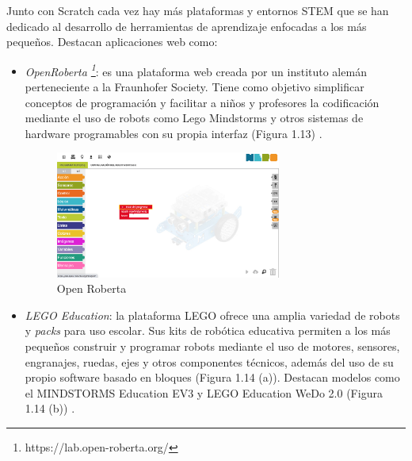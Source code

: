 Junto con Scratch cada vez hay más plataformas y entornos STEM que se han dedicado al desarrollo de herramientas de aprendizaje enfocadas a los más pequeños. Destacan aplicaciones web como: 

\begin{itemize}
    \item  \textit{OpenRoberta \footnote{https://lab.open-roberta.org/}}: es una plataforma web creada por un instituto alemán perteneciente a la Fraunhofer Society. Tiene como objetivo simplificar conceptos de programación y facilitar a niños y profesores la codificación mediante el uso de robots como Lego Mindstorms y otros sistemas de hardware programables con su propia interfaz (Figura 1.13)  \cite{openroberta}. 
    
    \begin{figure}[H]
        \centering
        \includegraphics[width=0.7\textwidth ]{chapters/images/openrobert.png}
        \caption{Open Roberta}
        \label{fig:openroberta}
    \end{figure}
    \item \textit{LEGO Education}: la plataforma LEGO ofrece una amplia variedad de robots y \textit{packs} para uso escolar. Sus kits de robótica educativa permiten a los más pequeños construir y programar robots mediante el uso de motores, sensores, engranajes, ruedas, ejes y otros componentes técnicos, además del uso de su propio software basado en bloques (Figura 1.14 (a)). Destacan modelos como el  MINDSTORMS Education EV3 y LEGO Education WeDo 2.0 (Figura 1.14 (b)) \cite{ev3}  \cite{legoeducation}.


\end{itemize}
